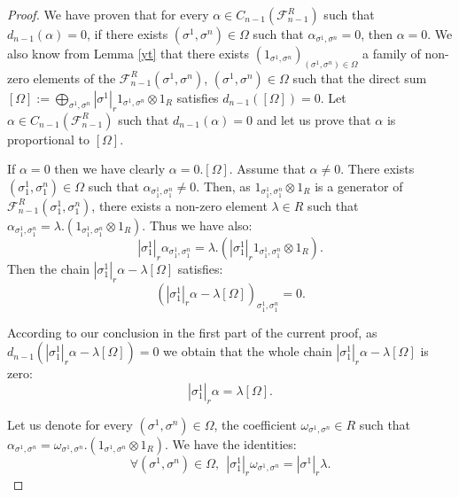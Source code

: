 \documentclass{article}
\begin{document}
\begin{proof}
    We have proven that for every $\alpha \in C_{n-1}(\mathcal{F}_{n-1}^{R})$ such that $d_{n-1}(\alpha) = 0$, if there exists $(\sigma^1,\sigma^n) \in \Omega$ such that $\alpha_{\sigma^1,\sigma^n} = 0$, then $\alpha = 0$. We also know from Lemma \ref{yt} that there exists $(1_{\sigma^1,\sigma^n})_{(\sigma^1,\sigma^n) \in \Omega}$ a family of non-zero elements of the $\mathcal{F}_{n-1}^{R}(\sigma^1,\sigma^n)$, $(\sigma^1,\sigma^n) \in \Omega$ such that the direct sum $[\Omega]:= \bigoplus_{\sigma^1,\sigma^n} |\sigma^1|_r1_{\sigma^1,\sigma^n} \otimes 1_R$ satisfies $d_{n-1}([\Omega]) = 0$. Let $\alpha \in C_{n-1}(\mathcal{F}_{n-1}^{R})$ such that $d_{n-1}(\alpha) = 0$ and let us prove that $\alpha$ is proportional to $[\Omega]$.

    If $\alpha = 0$ then we have clearly $\alpha = 0. [\Omega]$. Assume that $\alpha \neq 0$. There exists $(\sigma^1_1,\sigma^n_1) \in \Omega$ such that $\alpha_{\sigma^1_1,\sigma^n_1} \neq 0$. Then, as $1_{\sigma^1_1,\sigma^n_1} \otimes 1_R$ is a generator of $\mathcal{F}_{n-1}^R(\sigma^1_1,\sigma^n_1)$, there exists a non-zero element $\lambda \in R$ such that $\alpha_{\sigma^1_1,\sigma^n_1} = \lambda.(1_{\sigma^1_1,\sigma^n_1} \otimes 1_R)$. Thus we have also:
    \begin{equation*}
        |\sigma^1_1|_r\alpha_{\sigma^1_1,\sigma^n_1} = \lambda.(|\sigma^1_1|_r1_{\sigma^1_1,\sigma^n_1} \otimes 1_R).
    \end{equation*}
    Then the chain $|\sigma^1_1|_r\alpha - \lambda[\Omega]$ satisfies:
    \begin{equation*}
        \left ( |\sigma^1_1|_r\alpha - \lambda[\Omega]  \right )_{\sigma^1_1,\sigma^n_1} = 0.
    \end{equation*}

    According to our conclusion in the first part of the current proof, as $d_{n-1}(|\sigma^1_1|_r\alpha - \lambda[\Omega]) = 0$ we obtain that the whole chain $|\sigma^1_1|_r\alpha - \lambda[\Omega]$ is zero:
    \begin{equation*}
        |\sigma^1_1|_r\alpha = \lambda[\Omega].
    \end{equation*}

    Let us denote for every $(\sigma^1,\sigma^n) \in \Omega$, the coefficient $\omega_{\sigma^1,\sigma^n} \in R$ such that $\alpha_{\sigma^1,\sigma^n} = \omega_{\sigma^1,\sigma^n}.(1_{\sigma^1,\sigma^n}\otimes 1_R)$. We have the identities:
    \begin{equation*}
        \forall(\sigma^1,\sigma^n)\in\Omega,~~ |\sigma^1_1|_r\omega_{\sigma^1,\sigma^n} = |\sigma^1|_r\lambda.
    \end{equation*}


\end{proof}
\end{document}
